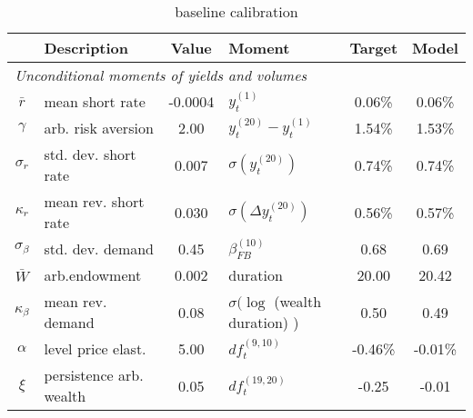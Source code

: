 \begin{table}[htbp]  
\centering  
\bgroup  
\def\arraystretch{1.25}  
\begin{tabular}{clclcc} \hline  
& Description & Value & Moment & Target & Model \\ \hline  
\multicolumn{6}{l}{\emph{Unconditional moments of yields and volumes}} \\  
$\bar{r}$  & mean short rate & -0.0004  & $y_{t}^{(1)}$ & 0.06\% & 0.06\%   \\ 
$\gamma$  & arb. risk aversion & 2.00  & $y_{t}^{(20)}-y_{t}^{(1)}$ & 1.54\% & 1.53\%   \\ 
$\sigma_r$ & std. dev. short rate & 0.007 & $\sigma ( y_{t}^{(20)} )$  & 0.74\% & 0.74\% \\ 
$\kappa_r$ & mean rev. short rate & 0.030 & $\sigma (\Delta y_{t}^{(20)})$ & 0.56\% & 0.57\% \\ 
$\sigma_{\beta}$ & std. dev. demand & 0.45 & $ \beta^{(10)}_{FB} $ & 0.68 & 0.69 \\ 
$\bar{W}$ & arb.endowment & 0.002 & duration & 20.00 & 20.42 \\ 
$\kappa_{\beta}$ & mean rev. demand & 0.08 & $\sigma (\log $ (wealth duration) ) & 0.50 & 0.49 \\ 
$\alpha$ & level price elast. & 5.00 & $ df_t^{(9,10)} $ & -0.46\% & -0.01\% \\ 
$\xi$ & persistence arb. wealth & 0.05 & $ df_t^{(19,20)} $ & -0.25 & -0.01 \\ 
\end{tabular} 
\egroup 
\caption{baseline calibration} 
\label{tab:cal} 
\end{table} 
